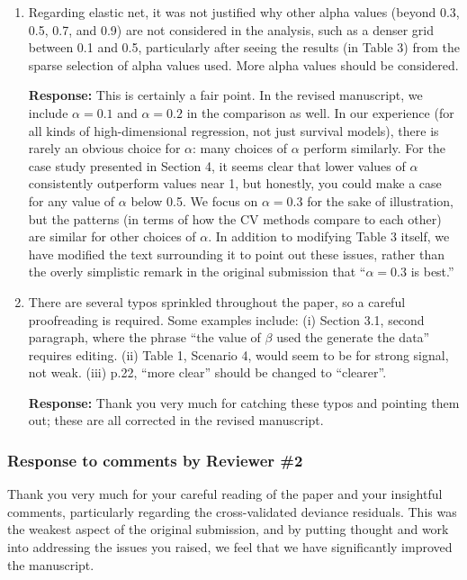 \documentclass{article}
\newcommand{\re}{\textbf{Response: }}
\begin{document}
\begin{enumerate}[align = left]
  \re Thank you for the suggestion; we now mention the precision lasso method in the discussion section.

\item Regarding elastic net, it was not justified why other alpha values (beyond 0.3, 0.5, 0.7, and 0.9) are not considered in the analysis, such as a denser grid between 0.1 and 0.5, particularly after seeing the results (in Table 3) from the sparse selection of alpha values used. More alpha values should be considered.

  \re This is certainly a fair point. In the revised manuscript, we include $\alpha=0.1$ and $\alpha=0.2$ in the comparison as well. In our experience (for all kinds of high-dimensional regression, not just survival models), there is rarely an obvious choice for $\alpha$: many choices of $\alpha$ perform similarly. For the case study presented in Section 4, it seems clear that lower values of $\alpha$ consistently outperform values near 1, but honestly, you could make a case for any value of $\alpha$ below 0.5. We focus on $\alpha=0.3$ for the sake of illustration, but the patterns (in terms of how the CV methods compare to each other) are similar for other choices of $\alpha$. In addition to modifying Table 3 itself, we have modified the text surrounding it to point out these issues, rather than the overly simplistic remark in the original submission that ``$\alpha=0.3$ is best.''

\item There are several typos sprinkled throughout the paper, so a careful proofreading is required. Some examples include: (i) Section 3.1, second paragraph, where the phrase ``the value of $\beta$ used the generate the data'' requires editing. (ii) Table 1, Scenario 4, would seem to be for strong signal, not weak. (iii) p.22, ``more clear'' should be changed to ``clearer''.

  \re Thank you very much for catching these typos and pointing them out; these are all corrected in the revised manuscript.

\end{enumerate}

\newpage

\subsubsection*{Response to comments by Reviewer \#2}

Thank you very much for your careful reading of the paper and your insightful comments, particularly regarding the cross-validated deviance residuals. This was the weakest aspect of the original submission, and by putting thought and work into addressing the issues you raised, we feel that we have significantly improved the manuscript.
\end{document}
